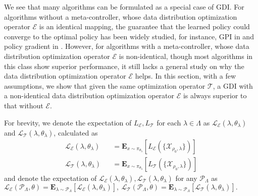 We see that many algorithms can be formulated as a special case of GDI.
For algorithms without a meta-controller, whose data distribution optimization operator $\mathcal{E}$ is an identical mapping, the guarantee that the learned policy could converge to the optimal policy has been widely studied, for instance, GPI in \citep{sutton} and policy gradient in \citep{pgtheory}.
However, for algorithms with a meta-controller, whose data distribution optimization operator $\mathcal{E}$ is non-identical, though most algorithms in this class show superior performance, it still lacks a general study on why the data distribution optimization operator $\mathcal{E}$ helps.
In this section, with a few assumptions, we show that given the same optimization operator $\mathcal{T}$, a GDI with a non-identical data distribution optimization operator $\mathcal{E}$ is always superior to that without $\mathcal{E}$.

For brevity, we denote the expectation of $L_\mathcal{E}, L_\mathcal{T}$ for each $\lambda \in \Lambda$ as $\mathcal{L}_{\mathcal{E}} (\lambda, \theta_\lambda) $ and $\mathcal{L}_{\mathcal{T}} (\lambda, \theta_\lambda)$, calculated as
\begin{equation*}
\begin{aligned}
        \mathcal{L}_{\mathcal{E}} (\lambda, \theta_\lambda) 
    && = \textbf{E}_{x \sim \pi_{\theta_\lambda}} [L_{\mathcal{E}} (\{\mathcal{X}_{\rho_0, \lambda}\})]\\ 
    \mathcal{L}_{\mathcal{T}} (\lambda, \theta_\lambda) 
    && = \textbf{E}_{x \sim \pi_{\theta_\lambda}} [L_{\mathcal{T}} (\{\mathcal{X}_{\rho_0, \lambda}\})]
\end{aligned}
\end{equation*}
and denote the expectation of $\mathcal{L}_\mathcal{E}(\lambda, \theta_\lambda), \mathcal{L}_\mathcal{T}(\lambda, \theta_\lambda)$ for any $\mathcal{P}_{\Lambda}$ as 
    $\mathcal{L}_{\mathcal{E}} (\mathcal{P}_{\Lambda}, \theta) 
    = \textbf{E}_{\lambda \sim \mathcal{P}_{\Lambda}} [\mathcal{L}_{\mathcal{E}} (\lambda, \theta_\lambda) ], \ 
    \mathcal{L}_{\mathcal{T}} (\mathcal{P}_{\Lambda}, \theta) 
    = \textbf{E}_{\lambda \sim \mathcal{P}_{\Lambda}}  [\mathcal{L}_{\mathcal{T}} (\lambda, \theta_\lambda)].$

